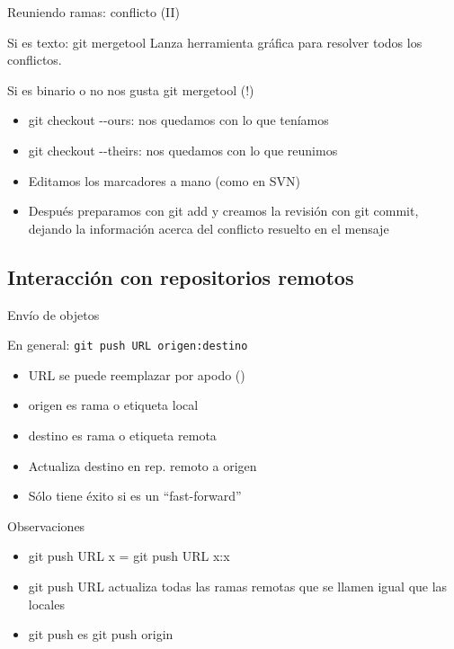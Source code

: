 \documentclass[xcolor=svgnames]{beamer}
\newcommand*{\remoto}[1]{\structure{#1}}
\newcommand*{\inlinecmd}[1]{{\small\ttfamily\nohyphens{#1}}}
\begin{document}
\begin{frame}{Reuniendo ramas: conflicto (II)}

  \begin{block}{Si es texto: \inlinecmd{git mergetool}}
    Lanza herramienta gráfica para resolver todos los conflictos.
  \end{block}

  \begin{block}{Si es binario o no nos gusta \inlinecmd{git mergetool} (!)}
    \begin{itemize}
    \item \inlinecmd{git checkout {-}-ours}: nos quedamos con lo que teníamos
    \item \inlinecmd{git checkout {-}-theirs}: nos quedamos con lo que reunimos
    \item Editamos los marcadores a mano (como en SVN)
    \item Después preparamos con \inlinecmd{git add} y
      creamos la revisión con \inlinecmd{git commit}, dejando la
      información acerca del conflicto resuelto en el mensaje
    \end{itemize}
  \end{block}
\end{frame}

\subsection{Interacción con repositorios remotos}

\begin{frame}{Envío de objetos}

  \begin{block}{En general: \texttt{git push URL origen:destino}}
    \begin{itemize}
    \item \inlinecmd{URL} se puede reemplazar por apodo (\remoto{origin})
    \item \inlinecmd{origen} es rama o etiqueta local
    \item \inlinecmd{destino} es rama o etiqueta remota
    \item Actualiza \inlinecmd{destino} en rep. remoto a \inlinecmd{origen}
    \item Sólo tiene éxito si es un \foreignquote{english}{fast-forward}
    \end{itemize}
  \end{block}

  \begin{block}{Observaciones}
    \begin{itemize}
    \item \inlinecmd{git push URL x} = \inlinecmd{git push URL x:x}
    \item \inlinecmd{git push URL} actualiza todas las ramas remotas
      que se llamen igual que las locales
    \item \inlinecmd{git push} es \inlinecmd{git push origin}
    \end{itemize}
  \end{block}
\end{frame}
\end{document}
